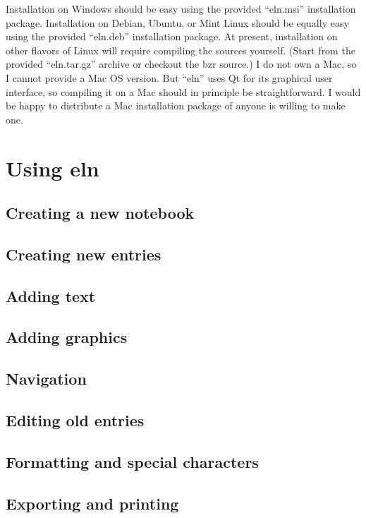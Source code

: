 \documentclass[11pt]{report}
\begin{document}
Installation on Windows should be easy using the provided ``eln.msi''
installation package. Installation on Debian, Ubuntu, or Mint Linux
should be equally easy using the provided ``eln.deb'' installation
package. At present, installation on other flavors of Linux will
require compiling the sources yourself. (Start from the provided
``eln.tar.gz'' archive or checkout the bzr source.) I do not own a
Mac, so I cannot provide a Mac OS version. But ``eln'' uses Qt for its
graphical user interface, so compiling it on a Mac should in principle
be straightforward. I would be happy to distribute a Mac installation
package of anyone is willing to make one.

\chapter{Using eln}


\section{Creating a new notebook}
\section{Creating new entries}
\section{Adding text}
\section{Adding graphics}
\section{Navigation}
\section{Editing old entries}
\section{Formatting and special characters}
\section{Exporting and printing}
\end{document}
